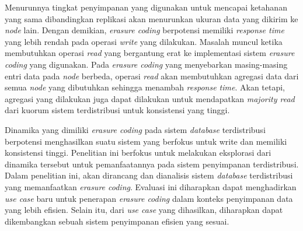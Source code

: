 Menurunnya tingkat penyimpanan yang digunakan untuk mencapai ketahanan yang sama dibandingkan replikasi akan menurunkan ukuran data yang dikirim ke \textit{node} lain. Dengan demikian, \textit{erasure coding} berpotensi memiliki \textit{response time} yang lebih rendah pada operasi \textit{write} yang dilakukan. Masalah muncul ketika membutuhkan operasi \textit{read} yang bergantung erat ke implementasi sistem \textit{erasure coding} yang digunakan. Pada \textit{erasure coding} yang menyebarkan masing-masing entri data pada \textit{node} berbeda, operasi \textit{read} akan membutuhkan agregasi data dari semua \textit{node} yang dibutuhkan sehingga menambah \textit{response time}. Akan tetapi, agregasi yang dilakukan juga dapat dilakukan untuk mendapatkan \textit{majority read} dari kuorum sistem terdistribusi untuk konsistensi yang tinggi.

Dinamika yang dimiliki \textit{erasure coding} pada sistem \textit{database} terdistribusi berpotensi menghasilkan suatu sistem yang berfokus untuk write dan memiliki konsistensi tinggi. Penelitian ini berfokus untuk melakukan eksplorasi dari dinamika tersebut untuk pemanfaatannya pada sistem penyimpanan terdistribusi. Dalam penelitian ini, akan dirancang dan dianalisis sistem \textit{database} terdistribusi yang memanfaatkan \textit{erasure coding}. Evaluasi ini diharapkan dapat menghadirkan \textit{use case} baru untuk penerapan \textit{erasure coding} dalam konteks penyimpanan data yang lebih efisien. Selain itu, dari \textit{use case} yang dihasilkan, diharapkan dapat dikembangkan sebuah sistem penyimpanan efisien yang sesuai.


